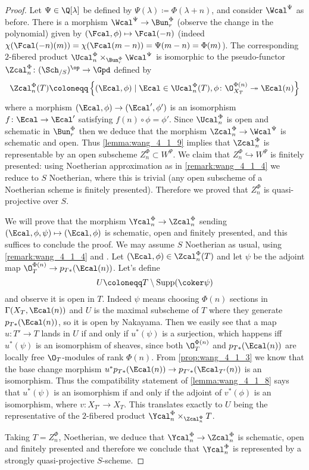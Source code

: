         \begin{proof}
            Let $\Psi \in \Q[\lambda]$ be defined by $\Psi(\lambda) \coloneqq \Phi(\lambda + n)$, and consider $\Wcal^{\Psi}$ as before. There is a morphism $\Wcal^{\Psi} \to \Bun_r^{\Phi}$ (observe the change in the polynomial) given by $(\Fcal, \phi) \mapsto \Fcal(-n)$ (indeed $\chi(\Fcal(-n)(m)) = \chi(\Fcal(m-n)) = \Psi(m-n) = \Phi(m)$). The corresponding $2$-fibered product $\Ucal_n^{\Phi} \times_{\Bun_r^{\Phi}} \Wcal^{\Psi}$ is isomorphic to the pseudo-functor $\Zcal_n^{\Phi}\colon (\Sch_{/S})^{\op} \to \Gpd$ defined by \[\Zcal_n^{\Phi}(T) \coloneqq \left\{(\Ecal, \phi) \mid \Ecal \in \Ucal_n^{\Phi}(T), \phi\colon \O_{X_T}^{\Phi(n)} \twoheadrightarrow \Ecal(n) \right\} \] where a morphism $(\Ecal, \phi) \to (\Ecal', \phi')$ is an isomorphism $f\colon \Ecal \to \Ecal'$ satisfying $f(n) \circ \phi = \phi'$. Since $\Ucal_n^{\Phi}$ is open and schematic in $\Bun_r^{\Phi}$ then we deduce that the morphism $\Zcal_n^{\Phi} \to \Wcal^{\Psi}$ is schematic and open. Thus \cref{lemma:wang_4_1_9} implies that $\Zcal_n^{\Phi}$ is representable by an open subscheme $Z_n^{\Phi} \subset W^{\Psi}$. We claim that $Z_n^{\Phi} \hookrightarrow W^{\Psi}$ is finitely presented: using Noetherian approximation as in \cref{remark:wang_4_1_4} we reduce to $S$ Noetherian, where this is trivial (any open subscheme of a Noetherian scheme is finitely presented). Therefore we proved that $Z^{\Phi}_n$ is quasi-projective over $S$.

            We will prove that the morphism $\Ycal^{\Phi}_n \to \Zcal_n^{\Phi}$ sending $(\Ecal, \phi, \psi) \mapsto (\Ecal, \phi)$ is schematic, open and finitely presented, and this suffices to conclude the proof.
            We may assume $S$ Noetherian as usual, using \cref{remark:wang_4_1_4} and \cite[Corollaire~4.5.5]{EGA1-second}. Let $(\Ecal, \phi) \in \Zcal_n^{\Phi}(T)$ and let $\psi$ be the adjoint map $\O_T^{\Phi(n)} \to p_{T*}(\Ecal(n))$. Let's define \[U \coloneqq T \setminus \mathrm{Supp}(\coker \psi) \] and observe it is open in $T$. Indeed $\psi$ means choosing $\Phi(n)$ sections in $\Gamma(X_T, \Ecal(n))$ and $U$ is the maximal subscheme of $T$ where they generate $p_{T*}(\Ecal(n))$, so it is open by Nakayama. Then we easily see that a map $u\colon T' \to T$ lands in $U$ if and only if $u^*(\psi)$ is a surjection, which happens iff $u^*(\psi)$ is an isomorphism of sheaves, since both $\O_T^{\Phi(n)}$ and $p_{T*}(\Ecal(n))$ are locally free $\O_T$-modules of rank $\Phi(n)$. From \cref{prop:wang_4_1_3} we know that the base change morphism $u^*p_{T*}(\Ecal(n)) \to p_{T'*}(\Ecal_{T'}(n))$ is an isomorphism. Thus the compatibility statement of \cref{lemma:wang_4_1_8} says that $u^*(\psi)$ is an isomorphism if and only if the adjoint of $v^*(\phi)$ is an isomorphism, where $v\colon X_{T'} \to X_T$. This translates exactly to $U$ being the representative of the $2$-fibered product $\Ycal_n^{\Phi} \times_{\Zcal_n^{\Phi}} T$.

            Taking $T = Z_n^{\Phi}$, Noetherian, we deduce that $\Ycal_n^{\Phi} \to \Zcal_n^{\Phi}$ is schematic, open and finitely presented and therefore we conclude that $\Ycal_n^{\Phi}$ is represented by a strongly quasi-projective $S$-scheme.
        \end{proof}

